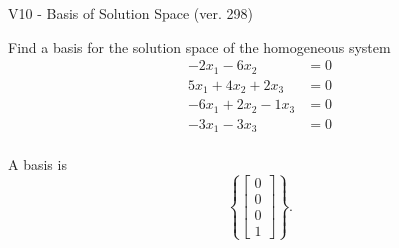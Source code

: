\begin{exercise}
  \begin{exerciseTitle}V10 - Basis of Solution Space (ver. 298)\end{exerciseTitle}
  \begin{exerciseStatement}
    Find a basis for the solution space of the homogeneous system 
\begin{align*}
 -2 x_ 1 -6 x_ 2 &= 0  \\ 
  5 x_ 1 + 4 x_ 2 + 2 x_ 3 &= 0  \\ 
  -6 x_ 1 + 2 x_ 2 -1 x_ 3 &= 0  \\ 
  -3 x_ 1 -3 x_ 3 &= 0  \\ 
 \end{align*}


 
  \end{exerciseStatement}

  \begin{exerciseAnswer}
   A basis is   
\[\left\{\left[\begin{array}{c}
0 \\
0 \\
0 \\
1
\end{array}\right]\right\}.\]

  


  \end{exerciseAnswer}
\end{exercise}